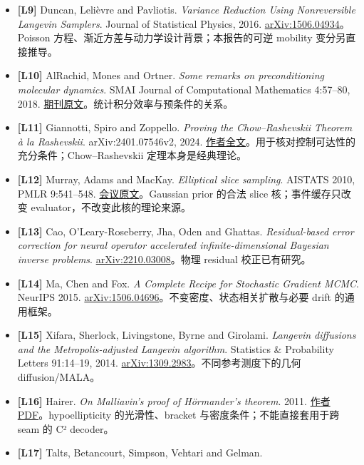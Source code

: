 \documentclass[
  11pt,
  a4paper,
]{article}
\begin{document}
\begin{itemize}
  子空间扰动结果；不是 R3 新定理。
\item
  \textbf{{[}L9{]}} Duncan, Lelièvre and Pavliotis. \emph{Variance
  Reduction Using Nonreversible Langevin Samplers}. Journal of
  Statistical Physics, 2016.
  \href{https://arxiv.org/abs/1506.04934}{arXiv:1506.04934}。Poisson
  方程、渐近方差与动力学设计背景；本报告的可逆 mobility 变分另直接推导。
\item
  \textbf{{[}L10{]}} AlRachid, Mones and Ortner. \emph{Some remarks on
  preconditioning molecular dynamics}. SMAI Journal of Computational
  Mathematics 4:57--80, 2018.
  \href{https://www.numdam.org/item/SMAI-JCM_2018__4__57_0/}{期刊原文}。统计积分效率与预条件的关系。
\item
  \textbf{{[}L11{]}} Giannotti, Spiro and Zoppello. \emph{Proving the
  Chow--Rashevskii Theorem à la Rashevskii}. arXiv:2401.07546v2, 2024.
  \href{https://arxiv.org/html/2401.07546v2}{作者全文}。用于核对控制可达性的充分条件；Chow--Rashevskii
  定理本身是经典理论。
\item
  \textbf{{[}L12{]}} Murray, Adams and MacKay. \emph{Elliptical slice
  sampling}. AISTATS 2010, PMLR 9:541--548.
  \href{https://proceedings.mlr.press/v9/murray10a.html}{会议原文}。Gaussian
  prior 的合法 slice 核；事件缓存只改变
  evaluator，不改变此核的理论来源。
\item
  \textbf{{[}L13{]}} Cao, O'Leary-Roseberry, Jha, Oden and Ghattas.
  \emph{Residual-based error correction for neural operator accelerated
  infinite-dimensional Bayesian inverse problems}.
  \href{https://arxiv.org/abs/2210.03008}{arXiv:2210.03008}。物理
  residual 校正已有研究。
\item
  \textbf{{[}L14{]}} Ma, Chen and Fox. \emph{A Complete Recipe for
  Stochastic Gradient MCMC}. NeurIPS 2015.
  \href{https://arxiv.org/abs/1506.04696}{arXiv:1506.04696}。不变密度、状态相关扩散与必要
  drift 的通用框架。
\item
  \textbf{{[}L15{]}} Xifara, Sherlock, Livingstone, Byrne and Girolami.
  \emph{Langevin diffusions and the Metropolis-adjusted Langevin
  algorithm}. Statistics \& Probability Letters 91:14--19, 2014.
  \href{https://arxiv.org/abs/1309.2983}{arXiv:1309.2983}。不同参考测度下的几何
  diffusion/MALA。
\item
  \textbf{{[}L16{]}} Hairer. \emph{On Malliavin's proof of Hörmander's
  theorem}. 2011. \href{https://hairer.org/papers/hormander.pdf}{作者
  PDF}。hypoellipticity 的光滑性、bracket 与密度条件；不能直接套用于跨
  seam 的 C² decoder。
\item
  \textbf{{[}L17{]}} Talts, Betancourt, Simpson, Vehtari and Gelman.

\end{itemize}
\end{document}
